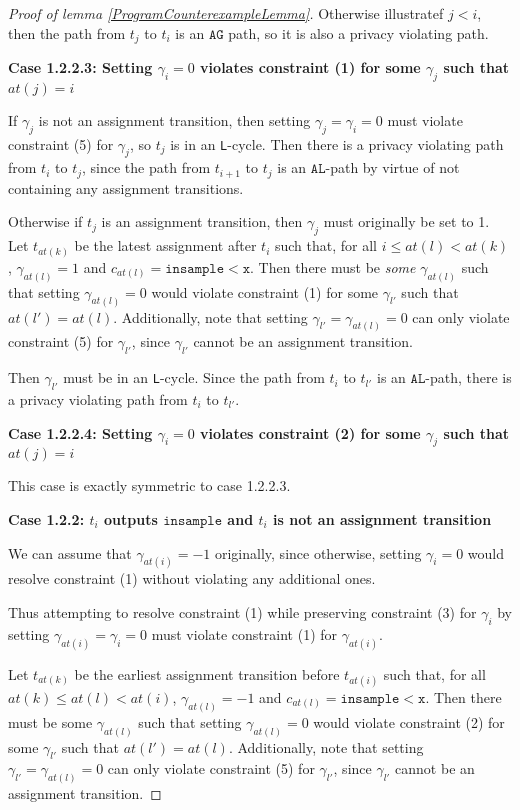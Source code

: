 \documentclass[12pt]{article}
\newcommand{\lguard}[1][x]{\texttt{insample} < #1}
\newcommand{\lcycle}{\texttt{L}-cycle}
\theoremstyle{definition}
\begin{document}
\begin{proof}[Proof of lemma \ref{ProgramCounterexampleLemma}]
    Otherwise illustratef $j<i$, then the path from $t_j$ to $t_i$ is an $\texttt{AG}$ path, so it is also a privacy violating path.

    \textbf{Case 1.2.2.3: Setting $\gamma_i =0$ violates constraint (1) for some $\gamma_j$ such that $at(j) = i$}

    If $\gamma_j$ is not an assignment transition, then setting $\gamma_j = \gamma_i = 0$ must violate constraint (5) for $\gamma_j$, so $t_j$ is in an \lcycle. Then there is a privacy violating path from $t_i$ to $t_j$, since the path from $t_{i+1}$ to $t_j$ is an $\texttt{AL}$-path by virtue of not containing any assignment transitions. 

    Otherwise if $t_j$ is an assignment transition, then $\gamma_j$ must originally be set to 1. Let $t_{at(k)}$ be the latest assignment after $t_{i}$ such that, for all $i\leq at(l)< at(k)$, $\gamma_{at(l)} = 1$ and $c_{at(l)} = \lguard[\texttt{x}]$. Then there must be \textit{some} $\gamma_{at(l)}$ such that setting $\gamma_{at(l)} = 0$ would violate constraint (1) for some $\gamma_{l'}$ such that $at(l') = at(l)$.  
    Additionally, note that setting $\gamma_{l'} = \gamma_{at(l)} = 0$ can only violate constraint (5) for $\gamma_{l'}$, since $\gamma_{l'}$ cannot be an assignment transition. 

    Then $\gamma_{l'}$ must be in an \lcycle. Since the path from $t_i$ to $t_{l'}$ is an $\texttt{AL}$-path, there is a privacy violating path from $t_i$ to $t_{l'}$.

    \textbf{Case 1.2.2.4: Setting $\gamma_i =0$ violates constraint (2) for some $\gamma_j$ such that $at(j) = i$}

    This case is exactly symmetric to case 1.2.2.3.

    \textbf{Case 1.2.2: $t_i$ outputs $\texttt{insample}$ and $t_i$ is not an assignment transition}

    We can assume that $\gamma_{at(i)} = -1$ originally, since otherwise, setting $\gamma_i = 0$ would resolve constraint (1) without violating any additional ones.

    Thus attempting to resolve constraint (1) while preserving constraint (3) for $\gamma_i$ by setting $\gamma_{at(i)}=\gamma_i =0$ must violate constraint (1) for $\gamma_{at(i)}$. 
   
    Let $t_{at(k)}$ be the earliest assignment transition before $t_{at(i)}$ such that, for all $at(k)\leq at(l)< at(i)$, $\gamma_{at(l)} = -1$ and $c_{at(l)} = \lguard[\texttt{x}]$. Then there must be some $\gamma_{at(l)}$ such that setting $\gamma_{at(l)} = 0$ would violate constraint (2) for some $\gamma_{l'}$ such that $at(l') = at(l)$.  
    Additionally, note that setting $\gamma_{l'} = \gamma_{at(l)} = 0$ can only violate constraint (5) for $\gamma_{l'}$, since $\gamma_{l'}$ cannot be an assignment transition. 
    

\end{proof}
\end{document}
